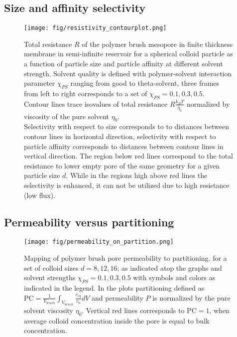 \documentclass[12pt, a4paper]{article}
\begin{document}
\subsection{Size and affinity selectivity}
\begin{figure}
    \centering
    \texttt{[image: fig/resistivity\_contourplot.png]}
    \caption{
        Total resistance $R$ of the polymer brush mesopore in finite thickness membrane in semi-infinite reservoir for a spherical colloid particle as a function of particle size and particle affinity at different solvent strength.
        Solvent quality is defined with polymer-solvent interaction parameter $\chi_{PS}$ ranging from good to theta-solvent, three frames from left to right corresponds to a set of $\chi_{PS} = {0.1, 0.3, 0.5}$.
        \\
        Contour lines trace isovalues of total resistance $R \frac{k_B T}{\eta_0}$ normalized by viscosity of the pure solvent $\eta_0$.
        \\
        Selectivity with respect to size corresponds to to distances between contour lines in horizontal direction, selectivity with respect to particle affinity corresponds to distances between contour lines in vertical direction.
        The region below red lines correspond to the total resistance to lower empty pore of the same geometry for a given particle size $d$.
        While in the regions high above red lines the selectivity is enhanced, it can not be utilized due to high resistance (low flux).
    }
    \label{fig:R_contourplot}
\end{figure}


\subsection{Permeability versus partitioning}

\begin{figure}
    \centering
    \texttt{[image: fig/permeability\_on\_partition.png]}
    \caption{
        Mapping of polymer brush pore permeability to partitioning.  for a set of colloid sizes $d = {8, 12, 16}$; as indicated atop the graphs and solvent strengths $\chi_{PS} = {0.1, 0.3, 0.5}$ with symbols and colors as indicated in the legend. 
        In the plots partitioning defined as $\textrm{PC} = \frac{1}{V_{brush}}\int_{V_{brush}} \frac{c_{eq}}{c_0} dV$ and permeability $P$ is normalized by the pure solvent viscosity $\eta_{0}$.
        Vertical red lines corresponds to $\textrm{PC}=1$, when average colloid concentration inside the pore is equal to bulk concentration.
        }
        \label{fig:permeability_on_partition}
    \end{figure}


\printbibliography
\end{document}
